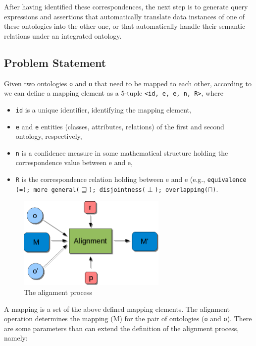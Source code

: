 After having identified these correspondences, the next step is to
generate query expressions and assertions that automatically translate
data instances of one of these ontologies into the other one, or that
automatically handle their semantic relations under an integrated
ontology. 

\subsection{Problem Statement}
\label{subsec:mediationproblem_problemstatement}
Given two ontologies \texttt{o} and
\texttt{o{\textquotesingle}} that need to be mapped to
each other, according to \cite{shvaiko2005schema_based} we can define a
mapping element as a 5-tuple \texttt{{\textless}id, e,
e{\textquotesingle}, n, R{\textgreater}}, where 

\begin{itemize}
\item \texttt{id} is a unique identifier, identifying the
mapping element, 
\item \texttt{e} and
\texttt{e{\textquotesingle}} entities (classes,
attributes, relations) of the first and second ontology, respectively, 
\item \texttt{n} is a confidence measure in some
mathematical structure holding the correspondence value between e and
e{\textquotesingle}, 
\item \texttt{R} is the correspondence relation holding
between e and e{\textquotesingle} (e.g.,
\texttt{equivalence (=); more general($\sqsupseteq$); disjointness($\perp$); overlapping($\sqcap$)}.
\end{itemize}

\begin{figure}
    \centering
        \includegraphics[width=72mm, height=45mm]{images/Alignment_process.png}%
        \caption{The alignment process}
    \label{fig:Alignment}
\end{figure}

A mapping is a set of the above defined mapping elements. The alignment
operation determines the mapping
(M\texttt{{\textquotesingle}}) for the pair of ontologies
(\texttt{o} and
\texttt{o{\textquotesingle}}). There are some parameters
than can extend the definition of the alignment process, namely: 

